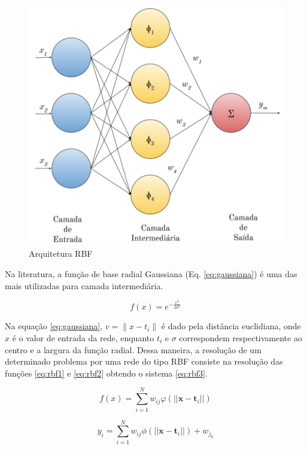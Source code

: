 \documentclass[qual, classic, a4paper]{ufbathesis}
\begin{document}
\begin{figure}[H]
\begin{center}
    \includegraphics[scale=1]{imagens/rbf_arq.png}
    \caption{Arquitetura RBF}
    \label{fig:rbg_arq}
\end{center}
\end{figure}

Na literatura, a função de base radial Gaussiana (Eq. \ref{eq:gaussiana}) é uma das mais utilizadas para camada intermediária.

\begin{equation} \label{eq:gaussiana}
    f(x)=e^{-{\frac {v^{2}}{2\sigma^{2}}}}
\end{equation}

Na equação \ref{eq:gaussiana}, $v = \lVert x - t_i \rVert$ é dado pela distância euclidiana, onde $x$ é o valor de entrada da rede, 
enquanto $t_i$ e $\sigma$ correspondem respectivamente ao centro e a largura da função radial. 
Dessa maneira, a resolução de um determinado problema por uma rede do tipo RBF consiste na resolução das funções \ref{eq:rbf1} e
\ref{eq:rbf2} obtendo o sistema \ref{eq:rbf3}.

\begin{equation} \label{eq:rbf1}
    f(x)=\sum _{{i=1}}^{N}w_{ij}\varphi (||{\mathbf  {x}}-{\mathbf  {t}}_{i}||)
\end{equation}

\begin{equation} \label{eq:rbf2}
    y_i=\sum _{{i=1}}^{N}w_{ij}\phi (||{\mathbf  {x}}-{\mathbf  {t}}_{i}||) + w_{j_0}
\end{equation}
\end{document}
